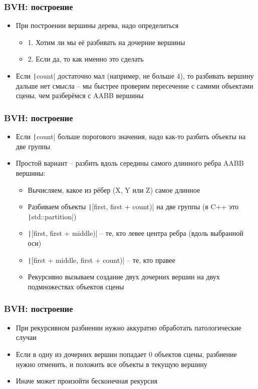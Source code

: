 \documentclass[10pt]{beamer}
\begin{document}
\begin{frame}[fragile]
\frametitle{BVH: построение}
\begin{itemize}
\item При построении вершины дерева, надо определиться
\pause
\begin{itemize}
\item 1. Хотим ли мы её разбивать на дочерние вершины
\pause
\item 2. Если да, то как именно это сделать
\end{itemize}
\pause
\item Если \texttt|count| достаточно мал (например, не больше 4), то разбивать вершину дальше нет смысла -- мы быстрее проверим пересечение с самими объектами сцены, чем разберёмся с AABB вершины
\end{itemize}
\end{frame}

\begin{frame}[fragile]
\frametitle{BVH: построение}
\begin{itemize}
\item Если \texttt|count| больше порогового значения, надо как-то разбить объекты на две группы
\pause
\item Простой вариант -- разбить вдоль середины самого длинного ребра AABB вершины:
\pause
\begin{itemize}
\item Вычисляем, какое из рёбер (X, Y или Z) самое длинное
\pause
\item Разбиваем объекты \texttt|[first, first + count)| на две группы (в C++ это \texttt|std::partition|)
\pause
\item \texttt|[first, first + middle)| -- те, кто левее центра ребра (вдоль выбранной оси)
\item \texttt|[first + middle, first + count)| -- те, кто правее
\pause
\item Рекурсивно вызываем создание двух дочерних вершин на двух подмножествах объектов сцены
\end{itemize}
\end{itemize}
\end{frame}

\begin{frame}[fragile]
\frametitle{BVH: построение}
\begin{itemize}
\item При рекурсивном разбиении нужно аккуратно обработать патологические случаи
\pause
\item Если в одну из дочерних вершин попадает 0 объектов сцены, разбиение нужно отменить, и положить все объекты в текущую вершину
\pause
\item Иначе может произойти бесконечная рекурсия
\end{itemize}
\end{frame}
\end{document}
